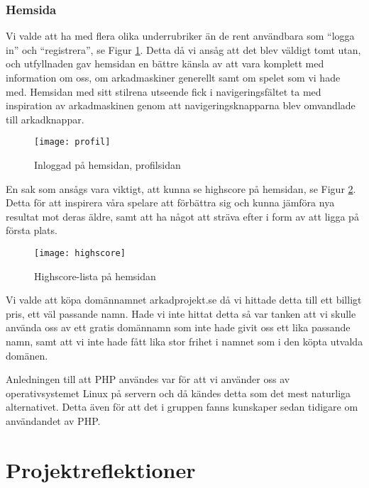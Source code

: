 \documentclass[12pt,fleqn,openany]{book} %
\begin{document}
\subsection{Hemsida}

Vi valde att ha med flera olika underrubriker än de rent användbara som “logga in” och “registrera”, se Figur \ref{fig_profilsida}.
Detta då vi ansåg att det blev väldigt tomt utan, och utfyllnaden gav hemsidan en bättre känsla av att vara komplett med information om 
oss, om arkadmaskiner generellt samt om spelet som vi hade med. Hemsidan med sitt stilrena utseende fick i navigeringsfältet ta med inspiration av arkadmaskinen genom att navigeringsknapparna blev 
omvandlade till arkadknappar. 

\begin{figure}[h]
\centering\texttt{[image: profil]}
\caption{Inloggad på hemsidan, profilsidan}
\label{fig_profilsida}
\end{figure}

En sak som ansågs vara viktigt, att kunna se highscore på hemsidan, se Figur \ref{fig_highscore}. Detta för att inspirera våra spelare att förbättra sig och kunna
jämföra nya resultat mot deras äldre, samt att ha något att sträva efter i form av att ligga på första plats.

\begin{figure}[!h]
\centering\texttt{[image: highscore]}
\caption{Highscore-lista på hemsidan}
\label{fig_highscore}
\end{figure}

Vi valde att köpa domännamnet arkadprojekt.se då vi hittade detta till ett billigt pris, ett väl passande namn. Hade vi inte hittat
detta så var tanken att vi skulle använda oss av ett gratis domännamn som inte hade givit oss ett lika passande namn, samt att vi inte
hade fått lika stor frihet i namnet som i den köpta utvalda domänen.  

Anledningen till att PHP användes var för att vi använder oss av operativsystemet Linux på servern och då kändes detta som det mest 
naturliga alternativet. Detta även för att det i gruppen fanns kunskaper sedan tidigare om användandet av PHP.

\chapter{Projektreflektioner}
\end{document}
